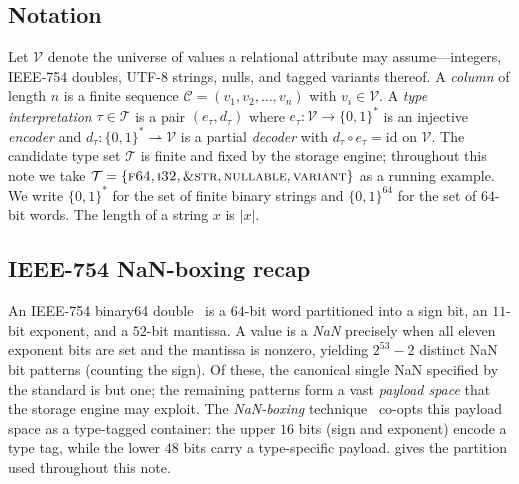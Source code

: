 \documentclass[10pt]{article}
\theoremstyle{definition}
\theoremstyle{remark}
\newcommand{\Vcal}{\mathcal{V}}
\newcommand{\Ccal}{\mathcal{C}}
\newcommand{\Tcal}{\mathcal{T}}
\newcommand{\bits}{\{0,1\}^*}
\begin{document}
\subsection{Notation}\label{sec:notation}

Let $\Vcal$ denote the universe of values a relational attribute may
assume---integers, IEEE-754 doubles, UTF-8 strings, nulls, and tagged
variants thereof. A \emph{column} of length $n$ is a finite sequence
$\Ccal = (v_1, v_2, \ldots, v_n)$ with $v_i \in \Vcal$. A \emph{type
interpretation} $\tau \in \Tcal$ is a pair $(e_\tau, d_\tau)$ where
$e_\tau : \Vcal \to \bits$ is an injective \emph{encoder} and
$d_\tau : \bits \rightharpoonup \Vcal$ is a partial \emph{decoder} with
$d_\tau \circ e_\tau = \mathrm{id}$ on $\Vcal$. The candidate type set
$\Tcal$ is finite and fixed by the storage engine; throughout this note
we take $\Tcal = \{\textsc{f64}, \textsc{i32}, \textsc{\&str},
\textsc{nullable}, \textsc{variant}\}$ as a running example. We write
$\bits$ for the set of finite binary strings and $\{0,1\}^{64}$ for the
set of $64$-bit words. The length of a string $x$ is $|x|$.

\subsection{IEEE-754 NaN-boxing recap}\label{sec:nanbox}

An IEEE-754 binary64 double~\citep{coverthomas} is a $64$-bit word
partitioned into a sign bit, an $11$-bit exponent, and a $52$-bit
mantissa. A value is a \emph{NaN} precisely when all eleven exponent bits
are set and the mantissa is nonzero, yielding $2^{53} - 2$ distinct NaN
bit patterns (counting the sign). Of these, the canonical single NaN
specified by the standard is but one; the remaining patterns form a vast
\emph{payload space} that the storage engine may exploit. The
\emph{NaN-boxing} technique~\citep{wingo2011} co-opts this payload space
as a type-tagged container: the upper $16$ bits (sign and exponent)
encode a type tag, while the lower $48$ bits carry a type-specific
payload.  gives the partition used throughout this note.
\end{document}
